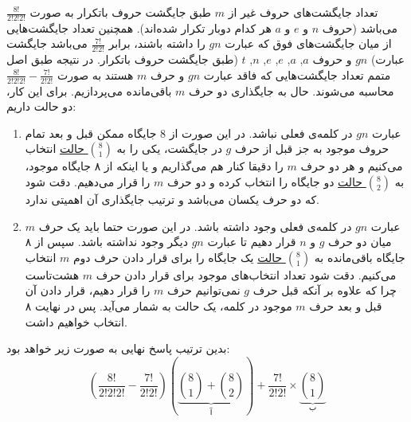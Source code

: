 \p
تعداد جایگشت‌های حروف غیر از $m$
طبق جایگشت‌ حروف باتکرار به صورت 
$\frac{8!}{2!2!2!}$
می‌باشد
(حروف $n$ و $e$ و $a$ هر کدام دوبار تکرار شده‌اند).
 همچنین تعداد جایگشت‌هایی از میان جایگشت‌های فوق که عبارت
 $gn$ 
 را داشته باشند، برابر
 \underline{$\frac{7!}{2!2!}$} 
  می‌باشد 
  جایگشت عبارت)
  $gn$
  و حروف
  $a$, 
  $a$, 
  $e$, 
  $e$, 
  $n$, 
  $t$
  (طبق جایگشت حروف باتکرار. 
 در نتیجه طبق اصل متمم تعداد جایگشت‌هایی که فاقد عبارت 
  $gn$
  و حرف 
  $m$   
  هستند به صورت  
  \underline{$\frac{8!}{2!2!2!} - \frac{7!}{2!2!}$} 
  محاسبه می‌شوند.
حال به جایگذاری دو حرف 
$m$
 باقی‌مانده می‌پردازیم. برای این کار، دو حالت داریم:
\begin{enumerate}
  \item 
  عبارت $gn$ در کلمه‌ی فعلی نباشد.
 در این صورت از 8 جایگاه ممکن 
  قبل و بعد تمام حروف موجود به جز قبل از حرف $g$ در جایگشت، 
یکی را به 
\underline{${8\choose 1}$ حالت}
 انتخاب می‌کنیم و هر دو حرف $m$ را دقیقا کنار هم می‌گذاریم
 و یا اینکه از ۸ جایگاه موجود، به 
\underline{${8\choose 2}$ حالت}
دو جایگاه را انتخاب کرده و دو حرف
 $m$
 را قرار می‌دهیم.
دقت شود که دو حرف یکسان می‌باشد و ترتیب جایگذاری آن اهمیتی ندارد.

  \item
  عبارت $gn$ در کلمه‌ی فعلی وجود داشته ‌باشد.
  در این صورت حتما باید یک حرف $m$ میان دو حرف 
  $g$ و $n$ قرار دهیم تا عبارت $gn$ دیگر وجود نداشته باشد.
  سپس از ۸ جایگاه باقی‌مانده به 
  \underline{${8\choose 1}$ حالت}
  یک جایگاه را برای قرار دادن حرف دوم $m$ انتخاب می‌کنیم. دقت شود تعداد انتخاب‌های موجود برای قرار دادن حرف $m$ هشت‌تاست چرا که علاوه بر آنکه قبل حرف $g$ نمی‌توانیم حرف $m$ را قرار دهیم، قرار دادن آن قبل و بعد حرف $m$ موجود در کلمه، یک حالت به شمار می‌آید. پس در نهایت ۸ انتخاب خواهیم داشت.
  
\end{enumerate}
\p
بدین ترتیب پاسخ نهایی به صورت زیر خواهد بود:
$$(\frac{8!}{2!2!2!} - \frac{7!}{2!2!})(\underbrace{{8\choose 1} + {8\choose 2}}_{\text{آ}}) + \frac{7!}{2!2!} \times \underbrace{{8\choose 1}}_{\text{ب}}$$
